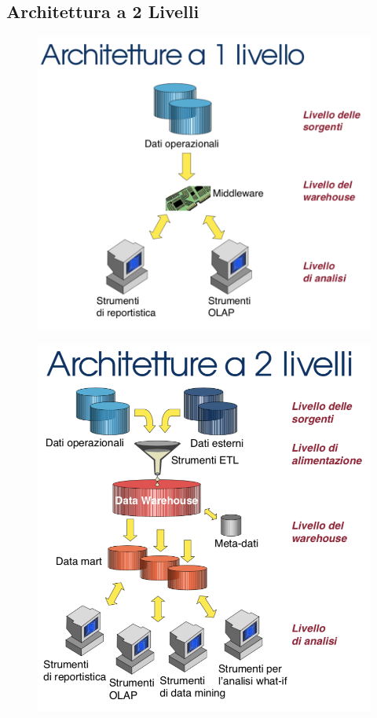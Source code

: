 \documentclass[a4paper, notitlepage, 9pt]{extreport}
\begin{document}
\subsection*{Architettura a 2 Livelli}
\begin{multicols}{2}
	\begin{figure}[H]
		\centering
		\includegraphics[scale=0.32]{Arch1Liv}
	\end{figure}
\columnbreak
	\begin{figure}[H]
		\centering
		\includegraphics[scale=0.32]{Arch2Liv}
	\end{figure}
\end{multicols}
\end{document}
